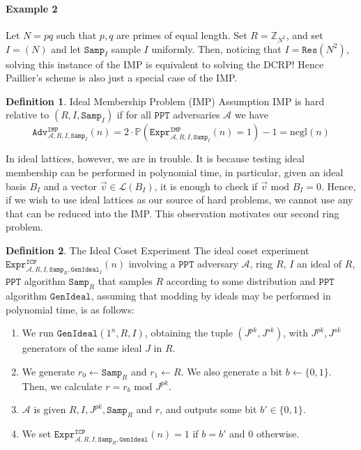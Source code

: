 \documentclass{article}
\theoremstyle{definition}
\newtheorem{definition}{Definition}[section]
\theoremstyle{example}
\newcommand{\A}{\mathcal{A}}
\renewcommand{\L}{\mathcal{L}}
\newcommand{\Prob}{\mathbb{P}}
\newcommand{\Int}{\mathbb{Z}}
\newcommand{\PPT}{\texttt{PPT}}
\newcommand{\negl}{\text{negl}}
\renewcommand{\mod}{\,\,\text{mod}\,\,}
\newcommand{\Expr}[2]{\texttt{Expr}^{\texttt{#1}}_{#2}}
\newcommand{\Adv}[2]{\texttt{Adv}^{\texttt{#1}}_{#2}}
\newcommand{\GenIdeal}{\texttt{GenIdeal}}
\newcommand{\Samp}{\texttt{Samp}}
\begin{document}
\paragraph{Example 2}
  Let $N = pq$ such that $p, q$ are primes of equal length. Set $R =
  \Int_{N^2}$, and set $I = (N)$ and let $\Samp_I$ sample $I$ uniformly. Then,
  noticing that $I = \texttt{Res}(N^2)$, solving this instance of the IMP is equivalent to solving the DCRP! Hence
  Paillier's scheme is also just a special case of the IMP.
\begin{definition}{Ideal Membership Problem (IMP) Assumption}
  IMP is hard relative to $(R, I, \Samp_I)$ if for all $\PPT$ adversaries $\A$ we have
  \[
    \Adv{IMP}{\A, R, I, \Samp_I}(n) = 2 \cdot \Prob(\Expr{IMP}{\A, R, I, \Samp_I}(n) = 1) - 1 = \negl(n)
  \]
\end{definition}
In ideal lattices, however, we are in trouble. It is because testing ideal
membership can be performed in polynomial time, in particular, given an ideal basis
$B_I$ and a vector $\vec{v} \in \L(B_I)$, it is enough to check if $\vec{v}
\mod B_I = 0$. Hence, if we wish to use ideal lattices as our source of hard
problems, we cannot use any that can be reduced into the IMP. This observation
motivates our second ring problem.
\begin{definition}{The Ideal Coset Experiment} The ideal coset experiment
  $\Expr{ICP}{\A, R, I, \Samp_R, \GenIdeal_I}(n)$ involving a $\PPT$ adversary $\A$, ring
  $R$, $I$ an ideal of $R$, $\PPT$ algorithm $\Samp_R$ that samples $R$
  according to some distribution and $\PPT$ algorithm $\GenIdeal$, assuming that modding by ideals may be performed
  in polynomial time, is as follows:
  \begin{enumerate}
  \item We run $\GenIdeal(1^n, R, I)$, obtaining the tuple $(J^{pk}, J^{sk})$,
    with $J^{pk}, J^{sk}$ generators of the same ideal $J$ in $R$.
  \item We generate $r_0 \leftarrow \Samp_R$ and $r_1 \leftarrow R$.
    We also generate a bit $b \leftarrow \{0, 1\}$. Then, we calculate $r = r_b
    \mod J^{pk}$.
  \item $\A$ is given $R, I, J^{pk}, \Samp_R$ and $r$, and outputs some bit $b' \in \{0, 1\}$.
  \item We set $\Expr{ICP}{\A, R, I, \Samp_R, \GenIdeal}(n) = 1$ if $b = b'$ and $0$ otherwise.
  \end{enumerate}
\end{definition}
\end{document}
